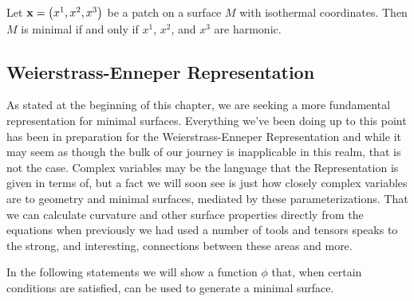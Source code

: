     
    \begin{lem}
      \label{lem:harmonic_minimal}
      Let $\mathbf{x} = \left(x^1, x^2, x^3\right)$ be a patch on a surface $M$ with isothermal coordinates. Then $M$ is minimal if and only if $x^1$, $x^2$, and $x^3$ are harmonic.
    \end{lem}
      

\subsection{Weierstrass-Enneper Representation}
  As stated at the beginning of this chapter, we are seeking a more fundamental representation for minimal surfaces. Everything we've been doing up to this point has been in preparation for the Weierstrass-Enneper Representation and while it may seem as though the bulk of our journey is inapplicable in this realm, that is not the case. Complex variables may be the language that the Representation is given in terms of, but a fact we will soon see is just how closely complex variables are to geometry and minimal surfaces, mediated by these parameterizations. That we can calculate curvature and other surface properties directly from the equations when previously we had used a number of tools and tensors speaks to the strong, and interesting, connections between these areas and more.

  In the following statements we will show a function $\phi$ that, when certain conditions are satisfied, can be used to generate a minimal surface.

